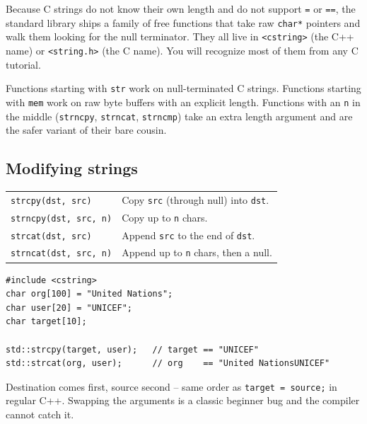 \documentclass[11pt]{article}
\begin{document}
Because C strings do not know their own length and do not support
\texttt{=} or \texttt{==}, the standard library ships a family of free
functions that take raw \texttt{char*} pointers and walk them looking
for the null terminator. They all live in \texttt{<cstring>} (the C++
name) or \texttt{<string.h>} (the C name). You will recognize most of
them from any C tutorial.

\begin{defnbox}
Functions starting with \texttt{str} work on null-terminated C strings.
Functions starting with \texttt{mem} work on raw byte buffers with an
explicit length. Functions with an \texttt{n} in the middle
(\texttt{strncpy}, \texttt{strncat}, \texttt{strncmp}) take an extra
length argument and are the safer variant of their bare cousin.
\end{defnbox}

\subsection{Modifying strings}

\begin{center}
\small
\begin{tabular}{ll}
\texttt{strcpy(dst, src)} & Copy \texttt{src} (through null) into \texttt{dst}. \\
\texttt{strncpy(dst, src, n)} & Copy up to \texttt{n} chars. \\
\texttt{strcat(dst, src)} & Append \texttt{src} to the end of \texttt{dst}. \\
\texttt{strncat(dst, src, n)} & Append up to \texttt{n} chars, then a null. \\
\end{tabular}
\normalsize
\end{center}

\begin{examplebox}
\begin{verbatim}
#include <cstring>
char org[100] = "United Nations";
char user[20] = "UNICEF";
char target[10];

std::strcpy(target, user);   // target == "UNICEF"
std::strcat(org, user);      // org    == "United NationsUNICEF"
\end{verbatim}
Destination comes first, source second -- same order as
\texttt{target = source;} in regular C++. Swapping the arguments is a
classic beginner bug and the compiler cannot catch it.
\end{examplebox}
\end{document}
